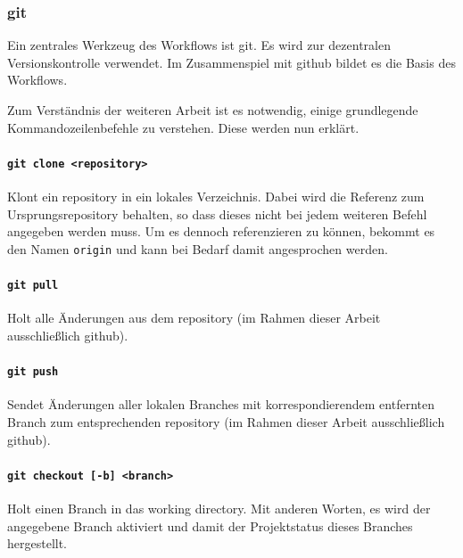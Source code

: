 
\subsubsection{git} %
\label{ssub:git}

Ein zentrales Werkzeug des Workflows ist \gls{git}. Es wird zur dezentralen Versionskontrolle verwendet. Im Zusammenspiel mit \gls{github} bildet es die Basis des Workflows.

Zum Verständnis der weiteren Arbeit ist es notwendig, einige grundlegende Kommandozeilenbefehle zu verstehen. Diese werden nun erklärt.

\paragraph{\lstinline!git clone <repository>!} %
\label{par:git_clone}
Klont ein \gls{repository} in ein lokales Verzeichnis. Dabei wird die Referenz zum Ursprungsrepository behalten, so dass dieses nicht bei jedem weiteren Befehl angegeben werden muss. Um es dennoch referenzieren zu können, bekommt es den Namen \lstinline!origin! und kann bei Bedarf damit angesprochen werden.

\paragraph{\lstinline!git pull!} %
\label{par:git_pull}
Holt alle Änderungen aus dem \gls{repository} (im Rahmen dieser Arbeit ausschließlich \gls{github}).

\paragraph{\lstinline!git push!} %
\label{par:git_push}
Sendet Änderungen aller lokalen Branches mit korrespondierendem entfernten Branch zum entsprechenden \gls{repository} (im Rahmen dieser Arbeit ausschließlich \gls{github}).

\paragraph{\lstinline!git checkout [-b] <branch>!} %
\label{par:git_checkout}
Holt einen Branch in das \gls{working directory}. Mit anderen Worten, es wird der angegebene Branch aktiviert und damit der Projektstatus dieses Branches hergestellt.

